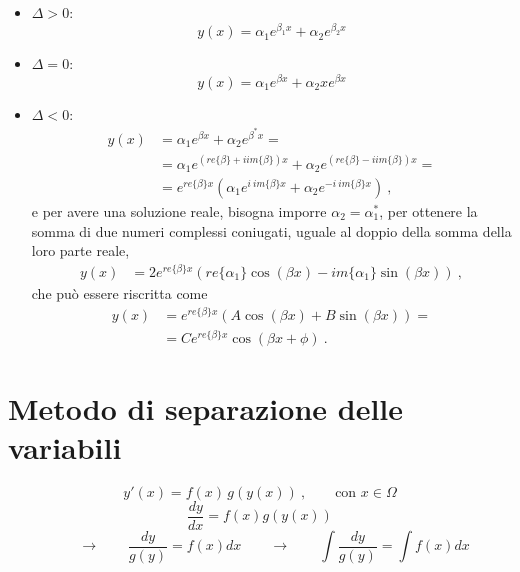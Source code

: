 \begin{itemize}
    \item $\Delta > 0$:
    \begin{equation}
       y(x) = \alpha_1 e^{\beta_1 x} + \alpha_2 e^{\beta_2 x}
    \end{equation}
    \item $\Delta = 0$:
    \begin{equation}
       y(x) = \alpha_1 e^{\beta x} + \alpha_2 x e^{\beta x}
    \end{equation}
    \item $\Delta < 0$:
    \begin{equation}
    \begin{aligned}
       y(x) & = \alpha_1 e^{\beta x} + \alpha_2 e^{\beta^* x} = \\
            & = \alpha_1 e^{(re\{ \beta \} + i im\{\beta\})x} + \alpha_2 e^{(re\{ \beta \} - i im\{\beta\}) x} = \\
            & = e^{re\{ \beta \}x} \left( \alpha_1 e^{i \ im\{\beta\} x} +  \alpha_2 e^{-i \ im\{\beta\}x }  \right) \ ,
    \end{aligned}
    \end{equation}
    e per avere una soluzione reale, bisogna imporre $\alpha_2 = \alpha_1^*$, per ottenere la somma di due numeri complessi coniugati, uguale al doppio della somma della loro parte reale,
    \begin{equation}
    \begin{aligned}
       y(x)  & = 2 e^{re\{ \beta \}x} \left( re\{ \alpha_1 \} \cos(\beta x) - im\{\alpha_1 \} \sin(\beta x) \right) \ ,
    \end{aligned}
    \end{equation}
che può essere riscritta come
    \begin{equation}
    \begin{aligned}
       y(x)  & = e^{re\{ \beta \}x} \left( A \cos(\beta x) + B \sin(\beta x) \right) = \\ 
             & = C e^{re\{ \beta \}x} \cos(\beta x + \phi)  \ .
    \end{aligned}
    \end{equation}
\end{itemize}

\chapter{Metodo di separazione delle variabili}
\begin{equation}
  y'(x) = f(x) \, g(y(x)) \ , \qquad \text{con $x \in \Omega$}
\end{equation}
\begin{equation}
 \dfrac{d y}{dx} = f(x) g(y(x))
\end{equation}
\begin{equation} \qquad \rightarrow \qquad
 \dfrac{d y}{g(y)} = f(x) dx  \qquad \rightarrow \qquad
 \int \dfrac{d y}{g(y)} = \int f(x) dx
\end{equation}


